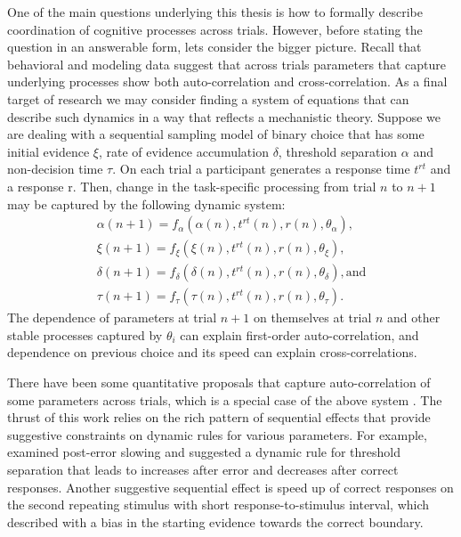 \documentclass[12pt]{report}
\begin{document}
One of the main questions underlying this thesis is how to formally describe coordination of cognitive processes across trials. However, before stating the question in an answerable form, lets consider the bigger picture. Recall that behavioral and modeling data suggest that across trials parameters that capture underlying processes show both auto-correlation and cross-correlation. As a final target of research we may consider finding a system of equations that can describe such dynamics in a way that reflects a mechanistic theory. Suppose we are dealing with a sequential sampling model of binary choice that has some initial evidence $\xi$, rate of evidence accumulation $\delta$, threshold separation $\alpha$ and non-decision time $\tau$. On each trial a participant generates a response time $t^{rt}$ and a response r. Then, change in the task-specific processing from trial $n$ to $n+1$ may be captured by the following dynamic system:
%
\begin{eqnarray}
\alpha(n+1) = f_{\alpha}(\alpha(n), t^{rt}(n), r(n),\theta_{\alpha}), \nonumber \\
\xi(n+1) = f_{\xi}(\xi(n), t^{rt}(n), r(n),\theta_{\xi}), \nonumber \\
\delta(n+1) = f_{\delta}(\delta(n), t^{rt}(n), r(n),\theta_{\delta}), \text{and} \nonumber \\
\tau(n+1) = f_{\tau}(\tau(n), t^{rt}(n), r(n),\theta_{\tau}).
\end{eqnarray}
%
The dependence of parameters at trial $n + 1$ on themselves at trial $n$ and other stable processes captured by $\theta_i$ can explain first-order auto-correlation, and dependence on previous choice and its speed can explain cross-correlations. 

There have been some quantitative proposals that capture auto-correlation of some parameters across trials, which is a special case of the above system \citep{Lam1968,Vic1979,Luc1986,ChoNys2002,BroMar2008,GaoWon2009,GolWon2012}. The thrust of this work relies on the rich pattern of sequential effects that provide suggestive constraints on dynamic rules for various parameters. For example,\citet{GolWon2012} examined post-error slowing and suggested a dynamic rule for threshold separation that leads to increases after error and decreases after correct responses. Another suggestive sequential effect is speed up of correct responses on the second repeating stimulus with short response-to-stimulus interval, which \citet{GaoWon2009} described with a bias in the starting evidence towards the correct boundary. 
\end{document}
